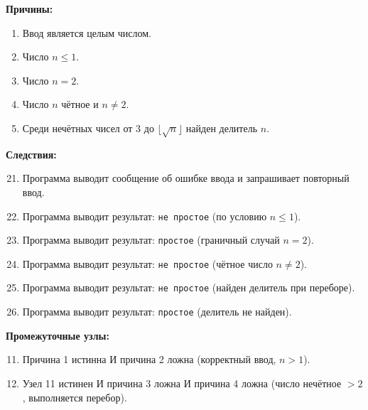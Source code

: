 \documentclass{article}[14pt]
\begin{document}
\textbf{Причины:}
\begin{enumerate}
    \item Ввод является целым числом.
    \item Число $n \leq 1$.
    \item Число $n = 2$.
    \item Число $n$ чётное и $n \neq 2$.
    \item Среди нечётных чисел от $3$ до $\lfloor\sqrt{n}\rfloor$ найден делитель $n$.
\end{enumerate}

\textbf{Следствия:}
\begin{enumerate}
    \setcounter{enumi}{20}
    \item Программа выводит сообщение об ошибке ввода и запрашивает повторный ввод.
    \item Программа выводит результат: \texttt{не простое} (по условию $n \leq 1$).
    \item Программа выводит результат: \texttt{простое} (граничный случай $n = 2$).
    \item Программа выводит результат: \texttt{не простое} (чётное число $n \neq 2$).
    \item Программа выводит результат: \texttt{не простое} (найден делитель при переборе).
    \item Программа выводит результат: \texttt{простое} (делитель не найден).
\end{enumerate}

\textbf{Промежуточные узлы:}
\begin{enumerate}
    \setcounter{enumi}{10}
    \item Причина 1 истинна И причина 2 ложна (корректный ввод, $n > 1$).
    \item Узел 11 истинен И причина 3 ложна И причина 4 ложна (число нечётное $> 2$, выполняется перебор).
\end{enumerate}
\end{document}

